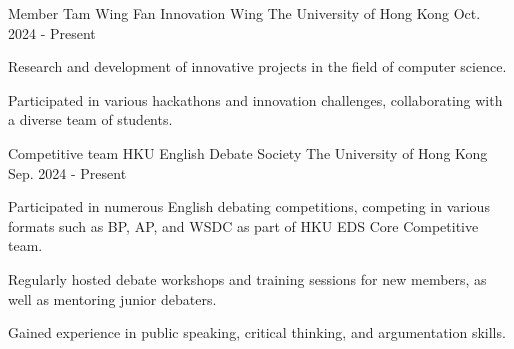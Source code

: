 

\begin{cventries}

\cventry
  {Member} %
  {Tam Wing Fan Innovation Wing} %
  {The University of Hong Kong} %
  {Oct. 2024 - Present} %
  {
    \begin{cvitems} %
      \item {Research and development of innovative projects in the field of computer science.}
      \item {Participated in various hackathons and innovation challenges, collaborating with a diverse team of students.}
    \end{cvitems}
  }

  \cventry
    {Competitive team} %
    {HKU English Debate Society} %
    {The University of Hong Kong} %
    {Sep. 2024 - Present} %
    {
      \begin{cvitems} %
        \item {Participated in numerous English debating competitions, competing in various formats such as BP, AP, and WSDC as part of HKU EDS Core Competitive team.}
        \item {Regularly hosted debate workshops and training sessions for new members, as well as mentoring junior debaters.}
        \item {Gained experience in public speaking, critical thinking, and argumentation skills.}
      \end{cvitems}
    }

\end{cventries}
